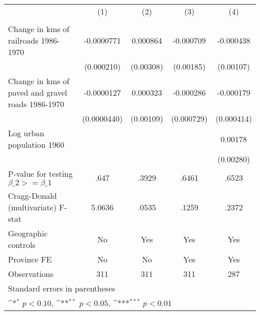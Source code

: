 {
\def\sym#1{\ifmmode^{#1}\else\(^{#1}\)\fi}
\begin{tabular}{l*{4}{c}}
\hline\hline
                &\multicolumn{1}{c}{(1)}&\multicolumn{1}{c}{(2)}&\multicolumn{1}{c}{(3)}&\multicolumn{1}{c}{(4)}\\
                &\multicolumn{1}{c}{}&\multicolumn{1}{c}{}&\multicolumn{1}{c}{}&\multicolumn{1}{c}{}\\
\hline
Change in kms of railroads 1986-1970&-0.0000771         & 0.000864         &-0.000709         &-0.000438         \\
                &(0.000210)         &(0.00308)         &(0.00185)         &(0.00107)         \\
[1em]
Change in kms of paved and gravel roads 1986-1970&-0.0000127         & 0.000323         &-0.000286         &-0.000179         \\
                &(0.0000440)         &(0.00109)         &(0.000729)         &(0.000414)         \\
[1em]
Log urban population 1960&                  &                  &                  &  0.00178         \\
                &                  &                  &                  &(0.00280)         \\
\hline
P-value for testing $\beta\_{2} >= \beta\_{1}$&     .647         &    .3929         &    .6461         &    .6523         \\
Cragg-Donald (multivariate) F-stat&   5.0636         &    .0535         &    .1259         &    .2372         \\
Geographic controls&       No         &      Yes         &      Yes         &      Yes         \\
Province FE     &       No         &       No         &      Yes         &      Yes         \\
Observations    &      311         &      311         &      311         &      287         \\
\hline\hline
\multicolumn{5}{l}{\footnotesize Standard errors in parentheses}\\
\multicolumn{5}{l}{\footnotesize \sym{*} \(p<0.10\), \sym{**} \(p<0.05\), \sym{***} \(p<0.01\)}\\
\end{tabular}
}
